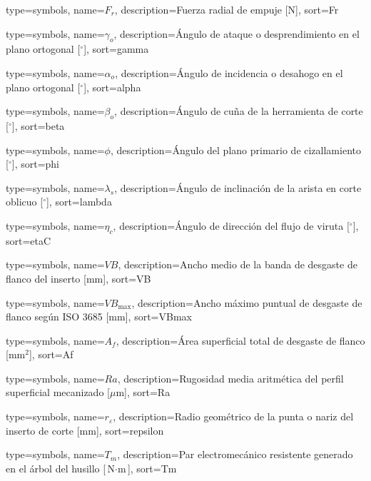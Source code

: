 {
    type=symbols,
    name={\ensuremath{F_r}},
    description={Fuerza radial de empuje [N]},
    sort=Fr
}

{
    type=symbols,
    name={\ensuremath{\gamma_o}},
    description={Ángulo de ataque o desprendimiento en el plano ortogonal [$^\circ$]},
    sort=gamma
}

{
    type=symbols,
    name={\ensuremath{\alpha_o}},
    description={Ángulo de incidencia o desahogo en el plano ortogonal [$^\circ$]},
    sort=alpha
}

{
    type=symbols,
    name={\ensuremath{\beta_o}},
    description={Ángulo de cuña de la herramienta de corte [$^\circ$]},
    sort=beta
}

{
    type=symbols,
    name={\ensuremath{\phi}},
    description={Ángulo del plano primario de cizallamiento [$^\circ$]},
    sort=phi
}

{
    type=symbols,
    name={\ensuremath{\lambda_s}},
    description={Ángulo de inclinación de la arista en corte oblicuo [$^\circ$]},
    sort=lambda
}

{
    type=symbols,
    name={\ensuremath{\eta_c}},
    description={Ángulo de dirección del flujo de viruta [$^\circ$]},
    sort=etaC
}

{
    type=symbols,
    name={\ensuremath{VB}},
    description={Ancho medio de la banda de desgaste de flanco del inserto [mm]},
    sort=VB
}

{
    type=symbols,
    name={\ensuremath{VB_{\max}}},
    description={Ancho máximo puntual de desgaste de flanco según ISO 3685 [mm]},
    sort=VBmax
}

{
    type=symbols,
    name={\ensuremath{A_f}},
    description={Área superficial total de desgaste de flanco [$\text{mm}^2$]},
    sort=Af
}

{
    type=symbols,
    name={\ensuremath{Ra}},
    description={Rugosidad media aritmética del perfil superficial mecanizado [$\mu$m]},
    sort=Ra
}

{
    type=symbols,
    name={\ensuremath{r_\varepsilon}},
    description={Radio geométrico de la punta o nariz del inserto de corte [mm]},
    sort=repsilon
}

{
    type=symbols,
    name={\ensuremath{T_m}},
    description={Par electromecánico resistente generado en el árbol del husillo [$\text{N}\cdot\text{m}$]},
    sort=Tm
}

